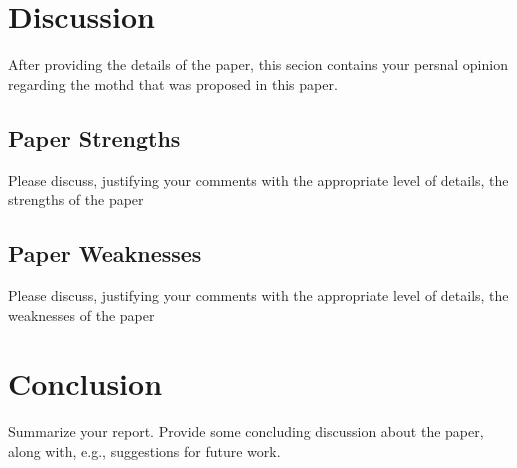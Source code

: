 \documentclass[12pt]{scrartcl}
\begin{document}
\section{Discussion} %
\label{sec:discussion}
After providing the details of the paper, this secion contains your persnal opinion regarding the mothd that was proposed in this paper.
\subsection{Paper Strengths} %
\label{sub:paper_strengths}
Please discuss, justifying your comments with the appropriate level of details, the strengths of the paper

\subsection{Paper Weaknesses} %
\label{sub:paper_weaknesses}
Please discuss, justifying your comments with the appropriate level of details, the weaknesses of the paper


\section{Conclusion}
Summarize your report.
Provide some concluding discussion about the paper, along with, e.g., suggestions for future work.


\newpage
\printbibliography
{}%
\end{document}
